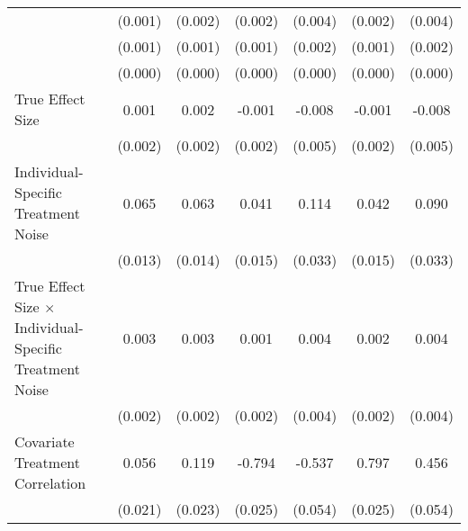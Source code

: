 \begin{table}[htbp]
\begin{tabular}{l*{6}{c}}
                    &     (0.001)         &     (0.002)         &     (0.002)         &     (0.004)         &     (0.002)         &     (0.004)         \\
                    &     (0.001)         &     (0.001)         &     (0.001)         &     (0.002)         &     (0.001)         &     (0.002)         \\
                    &     (0.000)         &     (0.000)         &     (0.000)         &     (0.000)         &     (0.000)         &     (0.000)         \\
True Effect Size    &       0.001         &       0.002         &      -0.001         &      -0.008         &      -0.001         &      -0.008         \\
                    &     (0.002)         &     (0.002)         &     (0.002)         &     (0.005)         &     (0.002)         &     (0.005)         \\
Individual-Specific Treatment Noise&       0.065\sym{***}&       0.063\sym{***}&       0.041\sym{**} &       0.114\sym{***}&       0.042\sym{**} &       0.090\sym{**} \\
                    &     (0.013)         &     (0.014)         &     (0.015)         &     (0.033)         &     (0.015)         &     (0.033)         \\
True Effect Size $\times$ Individual-Specific Treatment Noise&       0.003         &       0.003         &       0.001         &       0.004         &       0.002         &       0.004         \\
                    &     (0.002)         &     (0.002)         &     (0.002)         &     (0.004)         &     (0.002)         &     (0.004)         \\
Covariate Treatment Correlation&       0.056\sym{**} &       0.119\sym{***}&      -0.794\sym{***}&      -0.537\sym{***}&       0.797\sym{***}&       0.456\sym{***}\\
                    &     (0.021)         &     (0.023)         &     (0.025)         &     (0.054)         &     (0.025)         &     (0.054)         \\

\end{tabular}
\end{table}
